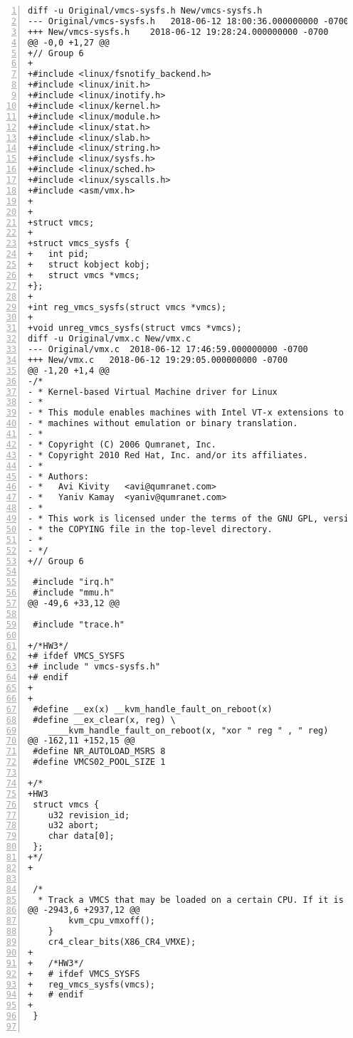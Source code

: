 \documentclass[10pt,draftclsnofoot,journal,compsoc,onecolumn]{IEEEtran}
\begin{document}
\begin{lstlisting}[numbers=left]
diff -u Original/vmcs-sysfs.h New/vmcs-sysfs.h
--- Original/vmcs-sysfs.h	2018-06-12 18:00:36.000000000 -0700
+++ New/vmcs-sysfs.h	2018-06-12 19:28:24.000000000 -0700
@@ -0,0 +1,27 @@
+// Group 6
+
+#include <linux/fsnotify_backend.h>
+#include <linux/init.h>
+#include <linux/inotify.h>
+#include <linux/kernel.h>
+#include <linux/module.h>
+#include <linux/stat.h>
+#include <linux/slab.h>
+#include <linux/string.h>
+#include <linux/sysfs.h>
+#include <linux/sched.h>
+#include <linux/syscalls.h>
+#include <asm/vmx.h>
+
+
+struct vmcs;
+
+struct vmcs_sysfs {
+	int pid;
+	struct kobject kobj;
+	struct vmcs *vmcs;
+};
+
+int reg_vmcs_sysfs(struct vmcs *vmcs);
+
+void unreg_vmcs_sysfs(struct vmcs *vmcs);
diff -u Original/vmx.c New/vmx.c
--- Original/vmx.c	2018-06-12 17:46:59.000000000 -0700
+++ New/vmx.c	2018-06-12 19:29:05.000000000 -0700
@@ -1,20 +1,4 @@
-/*
- * Kernel-based Virtual Machine driver for Linux
- *
- * This module enables machines with Intel VT-x extensions to run virtual
- * machines without emulation or binary translation.
- *
- * Copyright (C) 2006 Qumranet, Inc.
- * Copyright 2010 Red Hat, Inc. and/or its affiliates.
- *
- * Authors:
- *   Avi Kivity   <avi@qumranet.com>
- *   Yaniv Kamay  <yaniv@qumranet.com>
- *
- * This work is licensed under the terms of the GNU GPL, version 2.  See
- * the COPYING file in the top-level directory.
- *
- */
+// Group 6
 
 #include "irq.h"
 #include "mmu.h"
@@ -49,6 +33,12 @@
 
 #include "trace.h"
 
+/*HW3*/
+# ifdef VMCS_SYSFS
+# include " vmcs-sysfs.h"
+# endif
+
+
 #define __ex(x) __kvm_handle_fault_on_reboot(x)
 #define __ex_clear(x, reg) \
 	____kvm_handle_fault_on_reboot(x, "xor " reg " , " reg)
@@ -162,11 +152,15 @@
 #define NR_AUTOLOAD_MSRS 8
 #define VMCS02_POOL_SIZE 1
 
+/*
+HW3
 struct vmcs {
 	u32 revision_id;
 	u32 abort;
 	char data[0];
 };
+*/
+
 
 /*
  * Track a VMCS that may be loaded on a certain CPU. If it is (cpu!=-1), also
@@ -2943,6 +2937,12 @@
 		kvm_cpu_vmxoff();
 	}
 	cr4_clear_bits(X86_CR4_VMXE);
+
+	/*HW3*/
+	# ifdef VMCS_SYSFS
+	reg_vmcs_sysfs(vmcs);
+	# endif
+
 }
 

\end{lstlisting}
\end{document}
